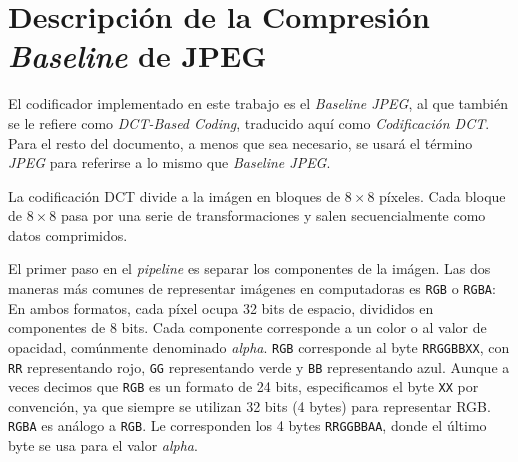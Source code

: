 \section{Descripción de la Compresión \emph{Baseline} de JPEG}

El codificador implementado en este trabajo es el \emph{Baseline JPEG}, al que
también se le refiere como \emph{DCT-Based Coding}, traducido aquí como
\emph{Codificación DCT}. Para el resto del documento, a menos que sea
necesario, se usará el término \emph{JPEG} para referirse a lo mismo que
\emph{Baseline JPEG}.

La codificación DCT divide a la imágen en bloques de $8\times8$ píxeles. Cada
bloque de $8\times8$ pasa por una serie de transformaciones y salen
secuencialmente como datos comprimidos.

El primer paso en el \emph{pipeline} es separar los componentes de la imágen.
Las dos maneras más comunes de representar imágenes en computadoras es
\verb+RGB+ o \verb+RGBA+: En ambos formatos, cada píxel ocupa 32 bits de
espacio, divididos en componentes de 8 bits. Cada componente corresponde a un
color o al valor de opacidad, comúnmente denominado \emph{alpha}. \verb+RGB+
corresponde al byte \verb+RRGGBBXX+, con \verb+RR+ representando rojo,
\verb+GG+ representando verde y \verb+BB+ representando azul. Aunque a veces
decimos que \verb+RGB+ es un formato de 24 bits, especificamos el byte
\verb+XX+ por convención, ya que siempre se utilizan 32 bits (4 bytes) para
representar RGB. \verb+RGBA+ es análogo a \verb+RGB+. Le corresponden los 4
bytes \verb+RRGGBBAA+, donde el último byte se usa para el valor \emph{alpha}.




